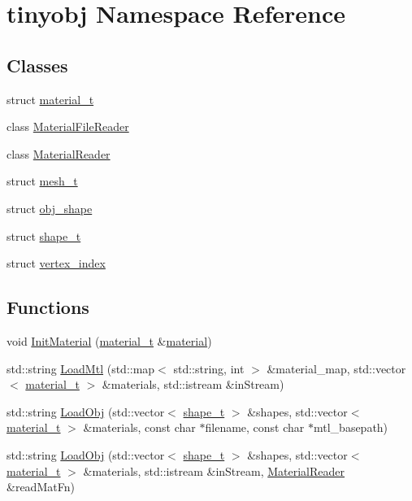 \hypertarget{namespacetinyobj}{}\section{tinyobj Namespace Reference}
\label{namespacetinyobj}
\subsection*{Classes}
\begin{DoxyCompactItemize}
\item 
struct \hyperlink{structtinyobj_1_1material__t}{material\+\_\+t}
\item 
class \hyperlink{classtinyobj_1_1_material_file_reader}{Material\+File\+Reader}
\item 
class \hyperlink{classtinyobj_1_1_material_reader}{Material\+Reader}
\item 
struct \hyperlink{structtinyobj_1_1mesh__t}{mesh\+\_\+t}
\item 
struct \hyperlink{structtinyobj_1_1obj__shape}{obj\+\_\+shape}
\item 
struct \hyperlink{structtinyobj_1_1shape__t}{shape\+\_\+t}
\item 
struct \hyperlink{structtinyobj_1_1vertex__index}{vertex\+\_\+index}
\end{DoxyCompactItemize}
\subsection*{Functions}
\begin{DoxyCompactItemize}
\item 
void \hyperlink{namespacetinyobj_a02670ede322e1cc5172fbaff43a1bdb5}{Init\+Material} (\hyperlink{structtinyobj_1_1material__t}{material\+\_\+t} \&\hyperlink{structmaterial}{material})
\item 
std\+::string \hyperlink{namespacetinyobj_aff17f9085eec34bcc7ba97025122e732}{Load\+Mtl} (std\+::map$<$ std\+::string, int $>$ \&material\+\_\+map, std\+::vector$<$ \hyperlink{structtinyobj_1_1material__t}{material\+\_\+t} $>$ \&materials, std\+::istream \&in\+Stream)
\item 
std\+::string \hyperlink{namespacetinyobj_a8a1b09e98bbe6ad056bf30fdce87b3c5}{Load\+Obj} (std\+::vector$<$ \hyperlink{structtinyobj_1_1shape__t}{shape\+\_\+t} $>$ \&shapes, std\+::vector$<$ \hyperlink{structtinyobj_1_1material__t}{material\+\_\+t} $>$ \&materials, const char $\ast$filename, const char $\ast$mtl\+\_\+basepath)
\item 
std\+::string \hyperlink{namespacetinyobj_acb20cdb095743e069eac27c0b95d32b8}{Load\+Obj} (std\+::vector$<$ \hyperlink{structtinyobj_1_1shape__t}{shape\+\_\+t} $>$ \&shapes, std\+::vector$<$ \hyperlink{structtinyobj_1_1material__t}{material\+\_\+t} $>$ \&materials, std\+::istream \&in\+Stream, \hyperlink{classtinyobj_1_1_material_reader}{Material\+Reader} \&read\+Mat\+Fn)
\end{DoxyCompactItemize}


